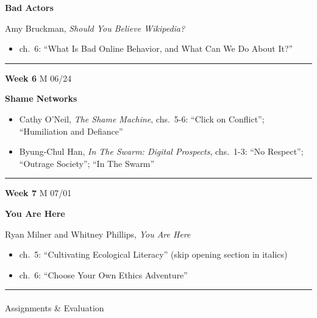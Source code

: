 \documentclass[
  letterpaper,
  DIV=11,
  numbers=noendperiod,
  oneside]{scrartcl}
\makeatletter
\let\oldparagraph\paragraph
\renewcommand{\paragraph}{
    \@ifstar
      \xxxParagraphStar
      \xxxParagraphNoStar
  }
\newcommand{\xxxParagraphStar}[1]{\oldparagraph*{#1}\mbox{}}
\newcommand{\xxxParagraphNoStar}[1]{\oldparagraph{#1}\mbox{}}
\providecommand{\tightlist}{%
  \setlength{\itemsep}{0pt}\setlength{\parskip}{0pt}}\usepackage{longtable,booktabs,array}
\makeatother
\begin{document}
\textbf{Bad Actors}

Amy Bruckman, \emph{Should You Believe Wikipedia?}

\begin{itemize}
\tightlist
\item
  ch.~6: ``What Is Bad Online Behavior, and What Can We Do About It?''
\end{itemize}

\begin{center}\rule{0.5\linewidth}{0.5pt}\end{center}

\textbf{Week 6} M 06/24

\textbf{Shame Networks}

\begin{itemize}
\tightlist
\item
  Cathy O'Neil, \emph{The Shame Machine}, chs.~5-6: ``Click on
  Conflict''; ``Humiliation and Defiance''
\item
  Byung-Chul Han, \emph{In The Swarm: Digital Prospects}, chs.~1-3: ``No
  Respect''; ``Outrage Society''; ``In The Swarm''
\end{itemize}

\begin{center}\rule{0.5\linewidth}{0.5pt}\end{center}

\textbf{Week 7} M 07/01

\textbf{You Are Here}

Ryan Milner and Whitney Phillips, \emph{You Are Here}

\begin{itemize}
\tightlist
\item
  ch.~5: ``Cultivating Ecological Literacy'' (skip opening section in
  italics)
\item
  ch.~6: ``Choose Your Own Ethics Adventure''
\end{itemize}

\begin{center}\rule{0.5\linewidth}{0.5pt}\end{center}

\paragraph{Assignments \& Evaluation}\label{assignments-evaluation}
\end{document}
